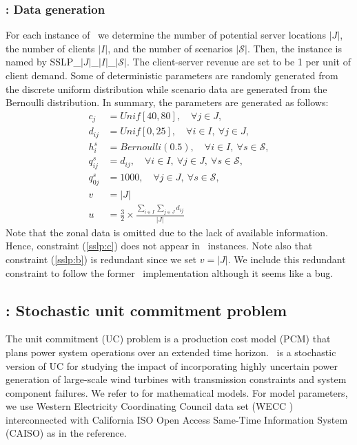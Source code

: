 \subsubsection{\sslp: Data generation}
For each instance of \sslp\, we determine the number of potential server locations $|J|$, the number of clients $|I|$, and the number of scenarios $|\mathcal{S}|$. Then, the instance is named by SSLP\_$|J|$\_$|I|$\_$|\mathcal{S}|$. The client-server revenue are set to be 1 per unit of client demand. Some of deterministic parameters are randomly generated from the discrete uniform distribution while scenario data are generated from the Bernoulli distribution. In summary, the parameters are generated as follows:
\begin{align*}
c_j	&=Unif[40,80],\quad\forall j\in J,\\
d_{ij}	&= Unif[0,25],\quad\forall i\in I,\ \forall j\in J,\\
h_i^s	&= Bernoulli(0.5),\quad\forall i\in I,\ \forall s\in \mathcal{S},\\
q_{ij}^s	&= d_{ij},\quad\forall i\in I,\ \forall j\in J,\ \forall s\in\mathcal{S},\\
q_{0j}^s	&=	1000,\quad\forall j\in J,\ \forall s\in\mathcal{S},\\
v 		&= |J|	\\
u	&= \frac{3}{2}\times\frac{\sum_{i\in I}\sum_{j\in J}d_{ij}}{|J|} 
\end{align*}
Note that the zonal data is omitted due to the lack of available information. Hence, constraint (\ref{sslp:c}) does not appear in \siplibtwo\ instances. Note also that constraint (\ref{sslp:b}) is redundant since we set $v=|J|$. We include this redundant constraint to follow the former \siplib\ implementation although it seems like a bug.

\subsection{\suc: Stochastic unit commitment problem} \label{SUC}
The unit commitment (UC) problem is a production cost model (PCM) that plans power system operations over an extended time horizon. \suc\ is a stochastic version of UC for studying the impact of incorporating highly uncertain power generation of large-scale wind turbines with transmission constraints and system component failures. We refer to \cite{journal:PO2013} for mathematical models. For model parameters, we use Western Electricity Coordinating Council data set (WECC \cite{web:wecc}) interconnected with California ISO Open Access Same-Time Information System (CAISO) as in the reference. 


